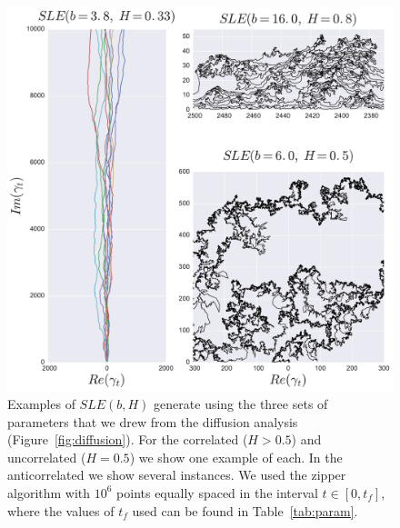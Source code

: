 \begin{figure}
\begin{center}
    \includegraphics[scale=0.5]{chapters/ch6-asle/figs/asle_traces}
\end{center}
\caption{Examples of $SLE(b,H)$ generate using the three sets of parameters
    that we drew from the diffusion analysis (Figure~\ref{fig:diffusion}). For
    the correlated ($H>0.5$) and uncorrelated ($H=0.5$) we show one example of
    each. In the anticorrelated we show several instances. We used the zipper
    algorithm with $10^6$ points equally spaced in the interval $t\in[0, t_f]$,
    where the values of $t_f$ used can be found in Table~\ref{tab:param}.}
\label{fig:asle_traces}
\end{figure}

